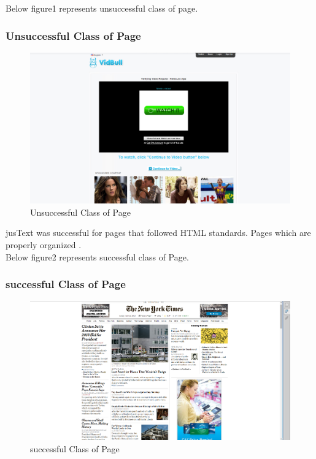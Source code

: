 \documentclass[12pt]{Report}
\begin{document}
Below figure1 represents unsuccessful class of page.\\


\subsubsection{Unsuccessful Class of Page}
\begin{figure}[ht]    
    \begin{center}
        \includegraphics[scale=0.60]{unsuccessful.png}
        \caption{Unsuccessful  Class of Page}
        \label{}
    \end{center}
\end{figure}
\newpage


jusText was successful for pages that followed HTML standards. Pages which are properly organized .\\

Below figure2 represents successful class of Page.

\subsubsection{successful Class of Page}
\begin{figure}[ht]    
    \begin{center}
        \includegraphics[scale=0.60]{SuccessfulPage.png}
        \caption{successful  Class of Page}
        \label{}
    \end{center}
\end{figure}
\newpage
\end{document}
